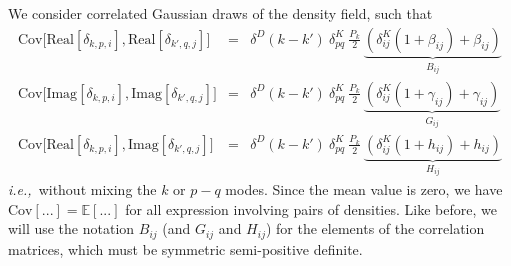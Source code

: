 \documentclass{aastex6}
\newcommand{\ie}{{\textit{i.e.,}~}}
\newcommand{\eqn}[1]{\begin{eqnarray}#1\end{eqnarray}}
\begin{document}
We consider correlated Gaussian draws of the density field, such that
\eqn{
	\mathrm{Cov}\bigl[\mathrm{Real}[\delta_{k, p, i}], \mathrm{Real}[\delta_{k', q, j}]\bigr] &=& \delta^D(k-k') \ \delta^K_{pq}\  \frac{P_k}{2}\ \underbrace{( \delta^K_{ij}(1+\beta_{ij}) + \beta_{ij})}_{B_{ij}}	\\
	\mathrm{Cov}\bigl[\mathrm{Imag}[\delta_{k, p, i}], \mathrm{Imag}[\delta_{k', q, j}] \bigr] &=& \delta^D(k-k') \ \delta^K_{pq}\  \frac{P_k}{2}\ \underbrace{( \delta^K_{ij}(1+\gamma_{ij}) + \gamma_{ij})}_{G_{ij}}\\
	\mathrm{Cov}\bigl[\mathrm{Real}[\delta_{k, p, i}], \mathrm{Imag}[\delta_{k', q, j}] \bigr] &=& \delta^D(k-k') \ \delta^K_{pq}\  \frac{P_k}{2}\ \underbrace{( \delta^K_{ij}(1+h_{ij}) + h_{ij})}_{H_{ij}}
}
\ie without mixing the $k$ or $p-q$ modes.
Since the mean value is zero, we have $\mathrm{Cov}[...] = \mathbb{E}[...]$ for all expression involving pairs of densities.
Like before, we will use the notation $B_{ij}$ (and $G_{ij}$ and $H_{ij}$) for the elements of the correlation matrices, which must be symmetric semi-positive definite.
\end{document}

